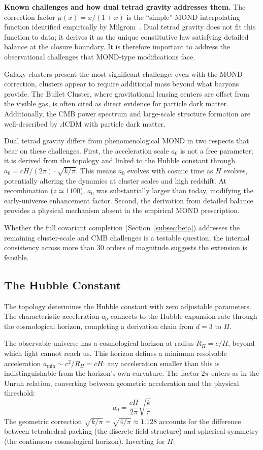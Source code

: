 \documentclass[aps,prd,preprint,superscriptaddress,showpacs,preprintnumbers,amsmath,amssymb,nofootinbib]{revtex4-2}
\begin{document}
\textbf{Known challenges and how dual tetrad gravity addresses them.} The correction factor $\mu(x) = x/(1+x)$ is the ``simple'' MOND interpolating function identified empirically by Milgrom~\cite{milgrom1983}. Dual tetrad gravity does not fit this function to data; it derives it as the unique constitutive law satisfying detailed balance at the closure boundary. It is therefore important to address the observational challenges that MOND-type modifications face.

Galaxy clusters present the most significant challenge: even with the MOND correction, clusters appear to require additional mass beyond what baryons provide. The Bullet Cluster, where gravitational lensing centers are offset from the visible gas, is often cited as direct evidence for particle dark matter. Additionally, the CMB power spectrum and large-scale structure formation are well-described by $\Lambda$CDM with particle dark matter.

Dual tetrad gravity differs from phenomenological MOND in two respects that bear on these challenges. First, the acceleration scale $a_0$ is not a free parameter; it is derived from the topology and linked to the Hubble constant through $a_0 = cH/(2\pi) \cdot \sqrt{k/\pi}$. This means $a_0$ evolves with cosmic time as $H$ evolves, potentially altering the dynamics at cluster scales and high redshift. At recombination ($z \simeq 1100$), $a_0$ was substantially larger than today, modifying the early-universe enhancement factor. Second, the derivation from detailed balance provides a physical mechanism absent in the empirical MOND prescription.

Whether the full covariant completion (Section~\ref{subsec:beta}) addresses the remaining cluster-scale and CMB challenges is a testable question; the internal consistency across more than 30 orders of magnitude suggests the extension is feasible.

\subsection{The Hubble Constant}
\label{subsec:hubble}

The topology determines the Hubble constant with zero adjustable parameters. The characteristic acceleration $a_0$ connects to the Hubble expansion rate through the cosmological horizon, completing a derivation chain from $d = 3$ to $H$.

The observable universe has a cosmological horizon at radius $R_H = c/H$, beyond which light cannot reach us. This horizon defines a minimum resolvable acceleration $a_{\min} \sim c^2/R_H = cH$: any acceleration smaller than this is indistinguishable from the horizon's own curvature. The factor $2\pi$ enters as in the Unruh relation, converting between geometric acceleration and the physical threshold:
\begin{equation}
a_0 = \frac{cH}{2\pi} \sqrt{\frac{k}{\pi}}
\label{eq:cosmo-connect}
\end{equation}
The geometric correction $\sqrt{k/\pi} = \sqrt{4/\pi} \approx 1.128$ accounts for the difference between tetrahedral packing (the discrete field structure) and spherical symmetry (the continuous cosmological horizon). Inverting for $H$:
\end{document}
